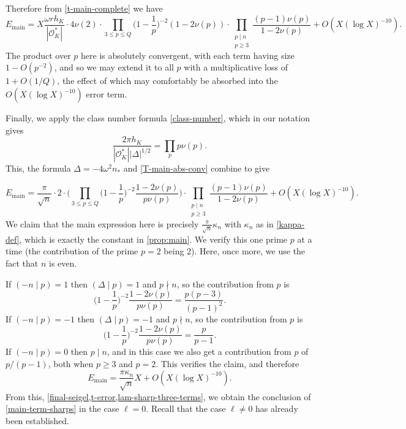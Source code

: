 \documentclass[11pt,reqno]{amsart}
\numberwithin{equation}{section}
\theoremstyle{definition}
\theoremstyle{remark}
\renewcommand{\le}{\leqslant}
\renewcommand{\ge}{\geqslant}
\newcommand{\legendre}[2]{(#1 \mid #2)}
\newcommand\main{{\textnormal{main}}}
\renewcommand\main{\operatorname{main}}
\renewcommand\O{\mathcal{O}}
\begin{document}
 Therefore from \cref{t-main-complete} we have
\begin{equation}\label{T-main-abs-conv} E_{\main} = X \frac{\omega rh_K}{|\O^*_K|} \cdot 4 \nu(2) \cdot  \prod_{3 \le p \le Q}\Big(1 - \frac{1}{p}\Big)^{-2} (1 - 2 \nu(p)) \cdot \prod_{\substack{p \mid n \\ p \ge 3}} \frac{(p-1)\nu(p)}{1 - 2 \nu(p)} + O(X(\log X)^{-10}).\end{equation}
The product over $p$ here is absolutely convergent, with each term having size $1 - O(p^{-2})$, and so we may extend it to all $p$ with a multiplicative loss of $1 + O(1/Q)$, the effect of which may comfortably be absorbed into the $O(X (\log X)^{-10})$ error term.

Finally, we apply the class number formula \cref{class-number}, which in our notation gives
\begin{equation}\label{class-number-truncate} \frac{2\pi h_K}{|\O_K^*| |\Delta|^{1/2}} =  \prod_{p} p \nu(p).\end{equation} This, the formula $\Delta = -4\omega^2 n_*$ and \cref{T-main-abs-conv} combine to give

 \begin{equation}\label{tmain-evaluated}
 E_{\main} =  \frac{\pi}{\sqrt{n}}\cdot 2 \cdot \bigg(\prod_{3 \le p \le Q} \Big(1 - \frac{1}{p}\Big)^{-2} \frac{1 - 2 \nu(p)}{p \nu(p)} \bigg) \cdot    \prod_{\substack{p \mid n \\ p \ge 3}}
 \frac{(p-1)\nu(p)}{1 - 2 \nu(p)} + O(X (\log X)^{-10}).
 \end{equation}
 We claim that the main expression here is precisely $\frac{\pi}{\sqrt{n}}\kappa_n$ with $\kappa_n$ as in \cref{kappa-def}, which is exactly the constant in \cref{prop:main}. We verify this one prime $p$ at a time (the contribution of the prime $p = 2$ being $2$). Here, once more, we use the fact that $n$ is even. 

 If $\legendre{-n}{p} = 1$ then $\legendre{\Delta}{p} = 1$ and $p \nmid n$, so the contribution from $p$ is
 \[ \Big(1 - \frac{1}{p}\Big)^{-2} \frac{1 - 2 \nu(p)}{p \nu(p)} = \frac{p(p-3)}{(p-1)^2}.\] 
 If $\legendre{-n}{p} = -1$ then $\legendre{\Delta}{p} = -1$ and $p \nmid n$, so the contribution from $p$ is
 \[ \Big(1 - \frac{1}{p}\Big)^{-2} \frac{1 - 2 \nu(p)}{p \nu(p)} = \frac{p}{p-1}.\] 
 If $\legendre{-n}{p} = 0$ then $p \mid n$, and in this case we also get a contribution from $p$ of $p/(p-1)$, both when $p \ge 3$ and $p = 2$.
 This verifies the claim, and therefore
 \[ E_{\main} = \frac{\pi \kappa_n}{\sqrt{n}}X  + O(X (\log X)^{-10}).\]
 From this, \cref{final-seigel,t-error,lam-sharp-three-terms}, we obtain the conclusion of \cref{main-term-sharps} in the case $\ell = 0$. Recall that the case $\ell \neq 0$ has already been established. \vspace*{8pt}
\end{document}
